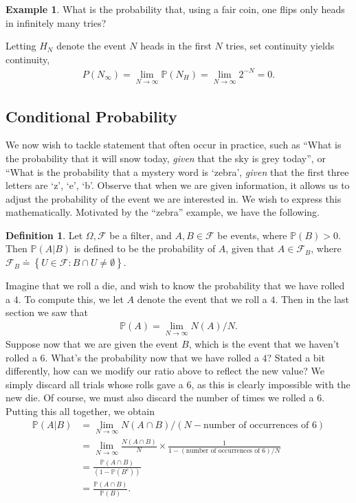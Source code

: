 \documentclass[12pt]{article}
\newcommand{\filter}{\mathcal{F}}
\newcommand{\prob}{\mathbb{P}}
\theoremstyle{plain}
\theoremstyle{definition}
\newtheorem*{definition}{Definition}
\newtheorem*{example}{Example}
\theoremstyle{remark}
\numberwithin{equation}{section}  %
\begin{document}
\begin{example}What is the probability that, using a fair coin, one
	flips only heads in infinitely many tries? 
\end{example}
Letting $H_N$ denote the event
$N$ heads in the first $N$ tries, set continuity yields
continuity,
\begin{align*}
	P(N_\infty) = \lim_{N \to \infty} \prob(N_H) = \lim_{N \to \infty} 2^{-N} = 
	0.
\end{align*}
\subsection{Conditional Probability}
We now wish to tackle statement that often occur in practice,
such as ``What is the probability that it will snow today, \emph{given}
that the sky is grey today'', or ``What is the probability that a mystery word
is `zebra', \emph{given} that the first three letters are
`z', `e', `b'.
Observe that when we are given information, it allows us to adjust the
probability of the event we are interested in. We wish to express this
mathematically. Motivated by the ``zebra'' example, we have the following.
\begin{definition}
	Let $\Omega, \filter$ be a filter, and $A, B \in \filter$ be events, where
	$\prob(B) > 0$. Then $\prob(A | B)$ is defined to be the probability of 
	$A$, given that $A \in \filter_B$, where $\filter_B
	\doteq \left\{ U \in \filter: B \cap U \neq \emptyset \right\}$.
\end{definition}
Imagine that we roll a die, and wish to know the probability that
we have rolled a $4$.
To compute this, we let $A$ denote the event that we roll a $4$. Then in the 
last section we saw
that
\begin{align*}
	\prob(A) = \lim_{N \to \infty} N(A)/N.
\end{align*}
Suppose now that we are given the event $B$, which is the event that we haven't
rolled a $6$.
What's the probability now that we have rolled a $4$?
Stated a bit differently, how can we modify our ratio above to reflect the
new value? We simply discard all trials whose rolls gave a $6$, as this is 
clearly
impossible with the new die. Of course, we must also discard the number of times
we rolled a $6$. Putting this all together, we obtain
\begin{align*}
	\prob(A | B) & = \lim_{N \to \infty} N(A \cap B)/(N -
	\text{number of occurrences of $6$})
	\\
	& = \lim_{N \to \infty} \frac{N(A \cap B)}{N}
	\times \frac{1}{1 - (\text{number of occurrences of $6$})/N}
	\\
	& = \frac{\prob(A \cap B)}{(1 - \prob(B^c))}
	\\
	& = \frac{\prob(A \cap B)}{\prob(B)}.
\end{align*}
\end{document}
